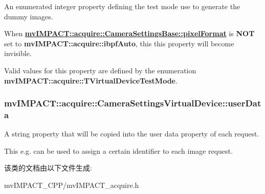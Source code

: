 An enumerated integer property defining the test mode use to generate the dummy images. 

When {\bfseries \hyperlink{classmv_i_m_p_a_c_t_1_1acquire_1_1_camera_settings_base_af295aa670e45c6cbdb6e5d8517922371}{mv\+I\+M\+P\+A\+C\+T\+::acquire\+::\+Camera\+Settings\+Base\+::pixel\+Format}} is {\bfseries N\+O\+T} set to {\bfseries mv\+I\+M\+P\+A\+C\+T\+::acquire\+::ibpf\+Auto}, this this property will become invisible.

Valid values for this property are defined by the enumeration {\bfseries mv\+I\+M\+P\+A\+C\+T\+::acquire\+::\+T\+Virtual\+Device\+Test\+Mode}. \hypertarget{classmv_i_m_p_a_c_t_1_1acquire_1_1_camera_settings_virtual_device_abb3e253cf1ce3d67b534362fd93856ec}{
\subsubsection[{user\+Data}]{ mv\+I\+M\+P\+A\+C\+T\+::acquire\+::\+Camera\+Settings\+Virtual\+Device\+::user\+Data}}\label{classmv_i_m_p_a_c_t_1_1acquire_1_1_camera_settings_virtual_device_abb3e253cf1ce3d67b534362fd93856ec}


A string property that will be copied into the user data property of each request. 

This e.\+g. can be used to assign a certain identifier to each image request. 

该类的文档由以下文件生成\+:\begin{DoxyCompactItemize}
\item 
mv\+I\+M\+P\+A\+C\+T\+\_\+\+C\+P\+P/mv\+I\+M\+P\+A\+C\+T\+\_\+acquire.\+h\end{DoxyCompactItemize}
